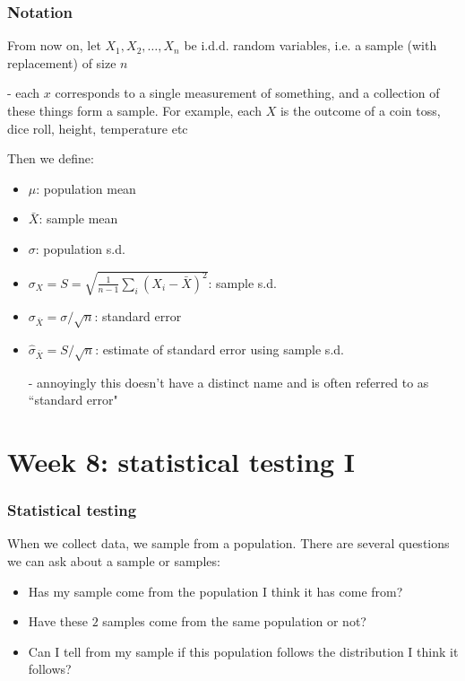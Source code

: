 \documentclass[t,8pt]{beamer}%
\begin{document}
\begin{frame}
	\frametitle{Notation}
	From now on, let $X_1,X_2,\dots,X_n$ be i.d.d. random variables, i.e. a sample (with replacement) of size $n$ \par
	{\small\color{NavyBlue} - each $x$ corresponds to a single measurement of something, and a collection of these things form a sample. For example, each $X$ is the outcome of a coin toss, dice roll, height, temperature etc} \par
	Then we define:
	\begin{itemize}
		\item $\mu$: population mean
		\item $\bar X$: sample mean
		\item $\sigma$: population s.d.
		\item $\sigma_X=S=\sqrt{\frac 1{n-1}\sum_i(X_i-\bar X)^2}$: sample s.d.
		\item $\sigma_{\bar X}=\sigma/\sqrt n$: standard error
		\item $\hat\sigma_{\bar X}=S/\sqrt n$: estimate of standard error using sample s.d. \par
		{\small\color{NavyBlue} - annoyingly this doesn't have a distinct name and is often referred to as ``standard error"}
	\end{itemize}
\end{frame}

\section{Week 8: statistical testing I}

\begin{frame}
	\frametitle{Statistical testing}
	When we collect data, we sample from a population. There are several questions we can ask about a sample or samples:
	\begin{itemize}
		\item Has my sample come from the population I think it has come from?%
		\item Have these $2$ samples come from the same population or not?
		\item Can I tell from my sample if this population follows the distribution I think it follows?
	\end{itemize}
\end{frame}
\end{document}
